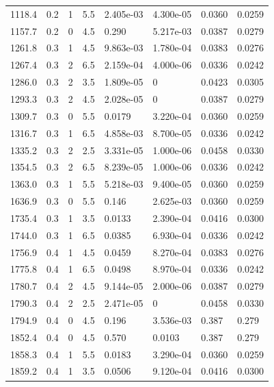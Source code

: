 \documentclass[preview]{standalone}
\begin{document}
{{{\begin{tabular}{L{1.2cm}C{1.2cm} C{0.3cm}C{0.5cm} C{1.4cm}C{1.4cm} C{1.4cm}C{1.4cm}}
  1118.4  &   0.2  & 1     & 5.5 &  2.405e-03  & 4.300e-05  & 0.0360 &  0.0259   \\ 
  1157.7  &   0.2  & 0     & 4.5 &  0.290  & 5.217e-03  & 0.0387 &  0.0279   \\ 
  1261.8  &   0.3  & 1     & 4.5 &  9.863e-03  & 1.780e-04  & 0.0383 &  0.0276   \\ 
  1267.4  &   0.3  & 2     & 6.5 &  2.159e-04  & 4.000e-06  & 0.0336 &  0.0242   \\ 
  1286.0  &   0.3  & 2     & 3.5 &  1.809e-05  & 0  & 0.0423 &  0.0305   \\ 
  1293.3  &   0.3  & 2     & 4.5 &  2.028e-05  & 0  & 0.0387 &  0.0279   \\ 
  1309.7  &   0.3  & 0     & 5.5 &  0.0179  & 3.220e-04  & 0.0360 &  0.0259   \\ 
  1316.7  &   0.3  & 1     & 6.5 &  4.858e-03  & 8.700e-05  & 0.0336 &  0.0242   \\ 
  1335.2  &   0.3  & 2     & 2.5 &  3.331e-05  & 1.000e-06  & 0.0458 &  0.0330   \\ 
  1354.5  &   0.3  & 2     & 6.5 &  8.239e-05  & 1.000e-06  & 0.0336 &  0.0242   \\ 
  1363.0  &   0.3  & 1     & 5.5 &  5.218e-03  & 9.400e-05  & 0.0360 &  0.0259   \\ 
  1636.9  &   0.3  & 0     & 5.5 &  0.146  & 2.625e-03  & 0.0360 &  0.0259   \\ 
  1735.4  &   0.3  & 1     & 3.5 &  0.0133  & 2.390e-04  & 0.0416 &  0.0300   \\ 
  1744.0  &   0.3  & 1     & 6.5 &  0.0385  & 6.930e-04  & 0.0336 &  0.0242   \\ 
  1756.9  &   0.4  & 1     & 4.5 &  0.0459  & 8.270e-04  & 0.0383 &  0.0276   \\ 
  1775.8  &   0.4  & 1     & 6.5 &  0.0498  & 8.970e-04  & 0.0336 &  0.0242   \\ 
  1780.7  &   0.4  & 2     & 4.5 &  9.144e-05  & 2.000e-06  & 0.0387 &  0.0279   \\ 
  1790.3  &   0.4  & 2     & 2.5 &  2.471e-05  & 0  & 0.0458 &  0.0330   \\ 
  1794.9  &   0.4  & 0     & 4.5 &  0.196  & 3.536e-03  & 0.387 &  0.279   \\ 
  1852.4  &   0.4  & 0     & 4.5 &  0.570  & 0.0103  & 0.387 &  0.279   \\ 
  1858.3  &   0.4  & 1     & 5.5 &  0.0183  & 3.290e-04  & 0.0360 &  0.0259   \\ 
  1859.2  &   0.4  & 1     & 3.5 &  0.0506  & 9.120e-04  & 0.0416 &  0.0300   \\ 

\end{tabular}}}}
\end{document}
